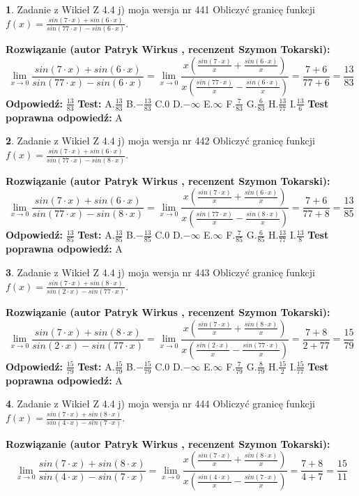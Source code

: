\documentclass[12pt, a4paper]{article}
\theoremstyle{definition} %
\newtheorem{zad}{}
\newcommand{\zadStart}[1]{\begin{zad}#1\newline}
\newcommand{\zadStop}{\end{zad}}
\newcommand{\rozwStart}[2]{\noindent \textbf{Rozwiązanie (autor #1 , recenzent #2): }\newline}
\newcommand{\rozwStop}{\newline}
\newcommand{\odpStart}{\noindent \textbf{Odpowiedź:}\newline}
\newcommand{\odpStop}{\newline}
\newcommand{\testStart}{\noindent \textbf{Test:}\newline}
\newcommand{\testStop}{\newline}
\newcommand{\kluczStart}{\noindent \textbf{Test poprawna odpowiedź:}\newline}
\newcommand{\kluczStop}{\newline}
\begin{document}
\zadStart{Zadanie z Wikieł Z 4.4 j) moja wersja nr 441}
Obliczyć granicę funkcji $f(x)=\frac{sin(7\cdot x) +sin(6\cdot x)}{sin(77\cdot x) -sin(6\cdot x)}$.
\zadStop
\rozwStart{Patryk Wirkus}{Szymon Tokarski}
$$\lim\limits_{x\to 0}\frac{sin(7\cdot x) +sin(6\cdot x)}{sin(77\cdot x) -sin(6\cdot x)}=\lim\limits_{x\to 0}\frac{x(\frac{sin(7\cdot x)}{x}+\frac{sin(6\cdot x)}{x})}{x(\frac{sin(77\cdot x)}{x}-\frac{sin(6\cdot x)}{x})}=\frac{7+6}{77+6} = \frac{13}{83}$$
\rozwStop
\odpStart
$\frac{13}{83}$
\odpStop
\testStart
A.$\frac{13}{83}$
B.$-\frac{13}{83}$
C.$0$
D.$-\infty$
E.$\infty$
F.$\frac{7}{83}$
G.$\frac{6}{83}$
H.$\frac{13}{77}$
I.$\frac{13}{6}$
\testStop
\kluczStart
A
\kluczStop



\zadStart{Zadanie z Wikieł Z 4.4 j) moja wersja nr 442}
Obliczyć granicę funkcji $f(x)=\frac{sin(7\cdot x) +sin(6\cdot x)}{sin(77\cdot x) -sin(8\cdot x)}$.
\zadStop
\rozwStart{Patryk Wirkus}{Szymon Tokarski}
$$\lim\limits_{x\to 0}\frac{sin(7\cdot x) +sin(6\cdot x)}{sin(77\cdot x) -sin(8\cdot x)}=\lim\limits_{x\to 0}\frac{x(\frac{sin(7\cdot x)}{x}+\frac{sin(6\cdot x)}{x})}{x(\frac{sin(77\cdot x)}{x}-\frac{sin(8\cdot x)}{x})}=\frac{7+6}{77+8} = \frac{13}{85}$$
\rozwStop
\odpStart
$\frac{13}{85}$
\odpStop
\testStart
A.$\frac{13}{85}$
B.$-\frac{13}{85}$
C.$0$
D.$-\infty$
E.$\infty$
F.$\frac{7}{85}$
G.$\frac{6}{85}$
H.$\frac{13}{77}$
I.$\frac{13}{8}$
\testStop
\kluczStart
A
\kluczStop



\zadStart{Zadanie z Wikieł Z 4.4 j) moja wersja nr 443}
Obliczyć granicę funkcji $f(x)=\frac{sin(7\cdot x) +sin(8\cdot x)}{sin(2\cdot x) -sin(77\cdot x)}$.
\zadStop
\rozwStart{Patryk Wirkus}{Szymon Tokarski}
$$\lim\limits_{x\to 0}\frac{sin(7\cdot x) +sin(8\cdot x)}{sin(2\cdot x) -sin(77\cdot x)}=\lim\limits_{x\to 0}\frac{x(\frac{sin(7\cdot x)}{x}+\frac{sin(8\cdot x)}{x})}{x(\frac{sin(2\cdot x)}{x}-\frac{sin(77\cdot x)}{x})}=\frac{7+8}{2+77} = \frac{15}{79}$$
\rozwStop
\odpStart
$\frac{15}{79}$
\odpStop
\testStart
A.$\frac{15}{79}$
B.$-\frac{15}{79}$
C.$0$
D.$-\infty$
E.$\infty$
F.$\frac{7}{79}$
G.$\frac{8}{79}$
H.$\frac{15}{2}$
I.$\frac{15}{77}$
\testStop
\kluczStart
A
\kluczStop



\zadStart{Zadanie z Wikieł Z 4.4 j) moja wersja nr 444}
Obliczyć granicę funkcji $f(x)=\frac{sin(7\cdot x) +sin(8\cdot x)}{sin(4\cdot x) -sin(7\cdot x)}$.
\zadStop
\rozwStart{Patryk Wirkus}{Szymon Tokarski}
$$\lim\limits_{x\to 0}\frac{sin(7\cdot x) +sin(8\cdot x)}{sin(4\cdot x) -sin(7\cdot x)}=\lim\limits_{x\to 0}\frac{x(\frac{sin(7\cdot x)}{x}+\frac{sin(8\cdot x)}{x})}{x(\frac{sin(4\cdot x)}{x}-\frac{sin(7\cdot x)}{x})}=\frac{7+8}{4+7} = \frac{15}{11}$$
\rozwStop
\odpStart
$\frac{15}{11}$
\odpStop
\testStart
A.$\frac{15}{11}$
B.$-\frac{15}{11}$
C.$0$
D.$-\infty$
E.$\infty$
F.$\frac{7}{11}$
G.$\frac{8}{11}$
H.$\frac{15}{4}$
I.$\frac{15}{7}$
\testStop
\kluczStart
A
\kluczStop
\end{document}
